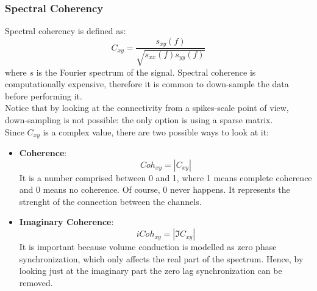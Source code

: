 \subsubsection{Spectral Coherency}
Spectral coherency is defined as:
\begin{equation*}
    C_{xy} = \frac{s_{xy}(f)}{\sqrt{s_{xx}(f)s_{yy}(f)}}
\end{equation*}
where \(s\) is the Fourier spectrum of the signal.
Spectral coherence is computationally expensive, therefore it is common to down-sample
the data before performing it.\\
Notice that by looking at the connectivity from a spikes-scale point of view,
down-sampling is not possible: the only option is using a sparse matrix.\\
Since \(C_{xy}\) is a complex value, there are two possible ways to look at it:
\begin{itemize}
    \item \textbf{Coherence}:
          \begin{equation*}
              Coh_{xy}=|C_{xy}|
          \end{equation*}
          It is a number comprised between 0 and 1, where 1 means complete coherence and 0
          means no coherence. Of course, 0 never happens. It represents the strenght of the
          connection between the channels.
    \item \textbf{Imaginary Coherence}:
          \begin{equation*}
              iCoh_{xy}=|\Im{C_{xy}}|
          \end{equation*}
          It is important because volume conduction is modelled as zero phase
          synchronization, which only affects the real part of the spectrum. Hence, by
          looking just at the imaginary part the zero lag synchronization can be removed.
\end{itemize}

